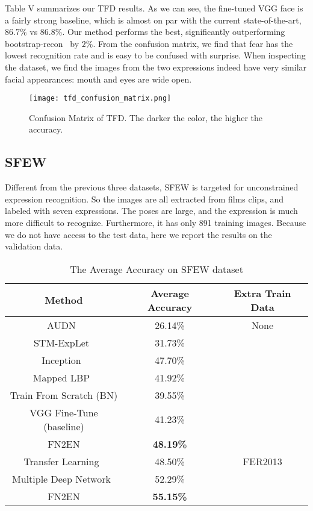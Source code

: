 \documentclass[a4paper, 10pt, conference]{ieeeconf}      %
\begin{document}
Table V summarizes our TFD results. As we can see, the fine-tuned VGG face is a fairly strong baseline, which is almost on par with the current state-of-the-art, $86.7\%$ vs $86.8\%$. Our method performs the best, significantly outperforming bootstrap-recon~\cite{reed2014training} by $2\%$. From the confusion matrix, we find that fear has the lowest recognition rate and is easy to be confused with surprise. When inspecting the dataset, we find the images from the two expressions indeed have very similar facial appearances: mouth and eyes are wide open.





\begin{figure}[!ht]
  \centering
  \texttt{[image: tfd\_confusion\_matrix.png]}
  \caption{Confusion Matrix of TFD. The darker the color, the higher the accuracy.}
  \label{figurelabel}
  \vspace{-2mm}
\end{figure}

\subsection{SFEW}
Different from the previous three datasets, SFEW is targeted for unconstrained expression recognition. So the images are all extracted from films clips, and labeled with seven expressions. The poses are large, and the expression is much more difficult to recognize. Furthermore, it has only 891 training images. Because we do not have access to the test data, here we report the results on the validation data. 


\begin{table}
\caption{The Average Accuracy on SFEW dataset}
\label{table_example}
\begin{center}
\begin{tabular}{|c||c||c|}
\hline
Method & Average Accuracy & Extra Train Data\\
\hline
AUDN~\cite{liu2013aware} & 26.14\% &None\\
STM-ExpLet~\cite{liu2014learning} & 31.73\% &\\
Inception~\cite{mollahosseini2016going} & 47.70\% & \\
Mapped LBP~\cite{levi2015emotion} & 41.92\% &\\
Train From Scratch (BN) &39.55\%&\\
VGG Fine-Tune (baseline) & 41.23\%&\\
FN2EN & \textbf{48.19\%} &\\
\hline
Transfer Learning~\cite{ng2015deep} & 48.50\% & FER2013\\
Multiple Deep Network~\cite{yu2015image} & 52.29\%&\\
FN2EN  & \textbf{55.15\%}&\\
\hline
\end{tabular}
\end{center}
\vspace{-2mm}
\end{table}
\end{document}
